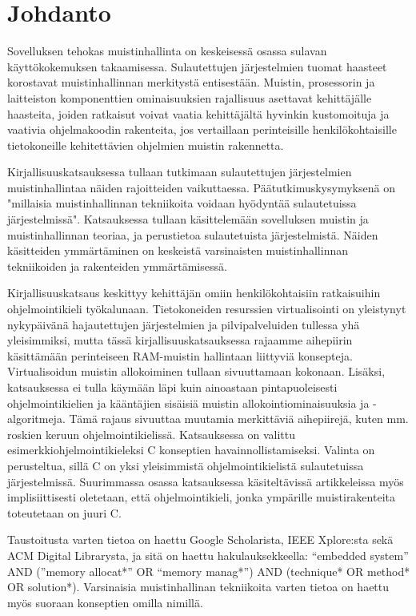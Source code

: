 \chapter{Johdanto} \label{Johdanto}

Sovelluksen tehokas muistinhallinta on keskeisessä osassa sulavan käyttökokemuksen takaamisessa. Sulautettujen järjestelmien tuomat haasteet korostavat muistinhallinnan merkitystä entisestään. Muistin, prosessorin ja laitteiston komponenttien ominaisuuksien rajallisuus asettavat kehittäjälle haasteita, joiden ratkaisut voivat vaatia kehittäjältä hyvinkin kustomoituja ja vaativia ohjelmakoodin rakenteita, jos vertaillaan perinteisille henkilökohtaisille tietokoneille kehitettävien ohjelmien muistin rakennetta.

Kirjallisuuskatsauksessa tullaan tutkimaan sulautettujen järjestelmien muistinhallintaa näiden rajoitteiden vaikuttaessa. Päätutkimuskysymyksenä on "millaisia muistinhallinnan tekniikoita voidaan hyödyntää sulautetuissa järjestelmissä". Katsauksessa tullaan käsittelemään sovelluksen muistin ja muistinhallinnan teoriaa, ja perustietoa sulautetuista järjestelmistä. Näiden käsitteiden ymmärtäminen on keskeistä varsinaisten muistinhallinnan tekniikoiden ja rakenteiden ymmärtämisessä.

Kirjallisuuskatsaus keskittyy kehittäjän omiin henkilökohtaisiin ratkaisuihin ohjelmointikieli työkalunaan. Tietokoneiden resurssien virtualisointi on yleistynyt nykypäivänä hajautettujen järjestelmien ja pilvipalveluiden tullessa yhä yleisimmiksi, mutta tässä kirjallisuuskatsauksessa rajaamme aihepiirin käsittämään perinteiseen RAM-muistin hallintaan liittyviä konsepteja. Virtualisoidun muistin allokoiminen tullaan sivuuttamaan kokonaan. Lisäksi, katsauksessa ei tulla käymään läpi kuin ainoastaan pintapuoleisesti ohjelmointikielien ja kääntäjien sisäisiä muistin allokointiominaisuuksia ja -algoritmeja. Tämä rajaus sivuuttaa muutamia merkittäviä aihepiirejä, kuten mm. roskien keruun ohjelmointikielissä. Katsauksessa on valittu esimerkkiohjelmointikieleksi C konseptien havainnollistamiseksi. Valinta on perusteltua, sillä C on yksi yleisimmistä ohjelmointikielistä sulautetuissa järjestelmissä. Suurimmassa osassa katsauksessa käsiteltävissä artikkeleissa myös implisiittisesti oletetaan, että ohjelmointikieli, jonka ympärille muistirakenteita toteutetaan on juuri C.

Taustoitusta varten tietoa on haettu Google Scholarista, IEEE Xplore:sta sekä ACM Digital Librarysta, ja sitä on haettu hakulauksekkeella: “embedded system” AND (”memory allocat*” OR “memory manag*”) AND (technique* OR method* OR solution*). Varsinaisia muistinhallinan tekniikoita varten tietoa on haettu myös suoraan konseptien omilla nimillä.

